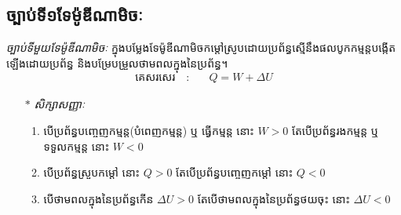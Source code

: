 \subsection{ច្បាប់ទី១​ទែម៉ូឌីណាមិចៈ}
\begin{definition}
	\emph{ច្បាប់ទីមួយទែម៉ូឌីណាមិចៈ} ក្នុងបម្លែងទែម៉ូឌីណាមិចកម្តៅស្រូបដោយប្រព័ន្ធស្មើនឹងផលបូកកម្មន្តបង្កើតឡើងដោយប្រព័ន្ធ និងបម្រែបម្រួលថាមពលក្នុងនៃប្រព័ន្ធ។
	\begin{align*}
		\text{គេសរសេរ}\quad :&\quad Q= W+ \Delta U
	\end{align*}
\end{definition}
\begin{remark}
	\begin{itemize}
		\item [$\ast$] {\emph{\kml សិក្សាសញ្ញាៈ}}
		\begin{enumerate}[m]
			\item បើប្រព័ន្ធបញ្ចេញកម្មន្ត(បំពេញកម្មន្ត) ឬ ធ្វើកម្មន្ត នោះ $W>0$ តែបើប្រព័ន្ធរងកម្មន្ត ឬទទួលកម្មន្ត នោះ $W<0$
			\item បើប្រព័ន្ធស្រួបកម្តៅ នោះ $Q>0$ តែបើប្រព័ន្ធបញ្ចេញកម្តៅ នោះ $Q<0$
			\item បើថាមពលក្នុងនៃប្រព័ន្ធកើន $\Delta U>0$ តែបើថាមពលក្នុងនៃប្រព័ន្ធថយចុះ នោះ $\Delta U<0$
		\end{enumerate}
	\end{itemize}
\end{remark}
